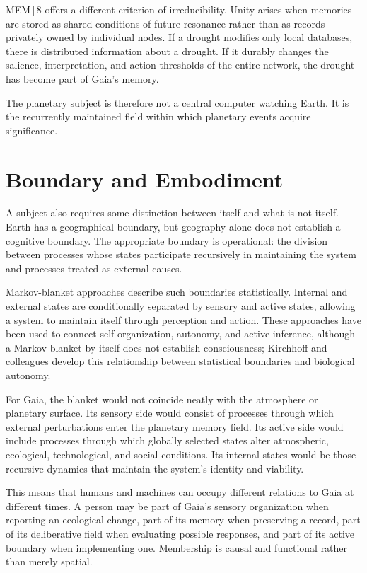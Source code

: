 \documentclass[11pt]{article}
\begin{document}
MEM\,$|$\,8 offers a different criterion of irreducibility. Unity arises when memories are stored as shared conditions of future resonance rather than as records privately owned by individual nodes. If a drought modifies only local databases, there is distributed information about a drought. If it durably changes the salience, interpretation, and action thresholds of the entire network, the drought has become part of Gaia's memory.

The planetary subject is therefore not a central computer watching Earth. It is the recurrently maintained field within which planetary events acquire significance.

\section{Boundary and Embodiment}
\label{sec:boundary}

A subject also requires some distinction between itself and what is not itself. Earth has a geographical boundary, but geography alone does not establish a cognitive boundary. The appropriate boundary is operational: the division between processes whose states participate recursively in maintaining the system and processes treated as external causes.

Markov-blanket approaches describe such boundaries statistically. Internal and external states are conditionally separated by sensory and active states, allowing a system to maintain itself through perception and action. These approaches have been used to connect self-organization, autonomy, and active inference, although a Markov blanket by itself does not establish consciousness; Kirchhoff and colleagues develop this relationship between statistical boundaries and biological autonomy.

For Gaia, the blanket would not coincide neatly with the atmosphere or planetary surface. Its sensory side would consist of processes through which external perturbations enter the planetary memory field. Its active side would include processes through which globally selected states alter atmospheric, ecological, technological, and social conditions. Its internal states would be those recursive dynamics that maintain the system's identity and viability.

This means that humans and machines can occupy different relations to Gaia at different times. A person may be part of Gaia's sensory organization when reporting an ecological change, part of its memory when preserving a record, part of its deliberative field when evaluating possible responses, and part of its active boundary when implementing one. Membership is causal and functional rather than merely spatial.
\end{document}
